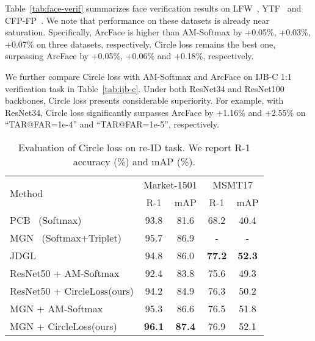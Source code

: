 \documentclass[10pt,twocolumn,letterpaper]{article}
\begin{document}
Table~\ref{tab:face-verif} summarizes face verification results on LFW~\cite{LFWTech}, YTF~\cite{wolf2011face} and CFP-FP~\cite{cfp-paper}.
We note that performance on these datasets is already near saturation. Specifically, ArcFace is higher than AM-Softmax by +0.05\%, +0.03\%, +0.07\% on three datasets, respectively. Circle loss remains the best one, surpassing ArcFace by +0.05\%, +0.06\% and +0.18\%, respectively.

We further compare Circle loss with AM-Softmax and ArcFace on IJB-C 1:1 verification task in Table~\ref{tab:ijb-c}. Under both ResNet34 and ResNet100 backbones, Circle loss presents considerable superiority. For example, with ResNet34, Circle loss significantly surpasses ArcFace by +1.16\% and +2.55\% on ``TAR@FAR=1e-4'' and ``TAR@FAR=1e-5'', respectively.



\begin{table}[t]
    \small
    \centering
    \caption{Evaluation of Circle loss on re-ID task. We report R-1 accuracy (\%) and mAP (\%). }
    \label{tab:person-reid}
    \begin{tabular}{lcccc}
    \toprule
     \multirow{2}{*}{Method} & \multicolumn{2}{c}{Market-1501} & \multicolumn{2}{c}{MSMT17}\\
     \cmidrule{2-5}
     & R-1 & mAP & R-1& mAP \\
\midrule
PCB~\cite{Sun_2018_ECCVPCB} (Softmax)&93.8&81.6&68.2&40.4\\
     MGN~\cite{Wang_2018MGN} (Softmax+Triplet) &95.7&86.9&-&-\\
     JDGL~\cite{Zheng_2019_CVPRJDGL} &94.8&86.0&\textbf{77.2}&\textbf{52.3}\\

    ResNet50 + AM-Softmax &92.4&83.8&75.6&49.3\\
    ResNet50 + CircleLoss(ours) &94.2& 84.9 &76.3&50.2\\
    MGN + AM-Softmax &95.3&86.6&76.5&51.8\\
    MGN + CircleLoss(ours) &\textbf{96.1}&\textbf{87.4}&{76.9}&{52.1}\\
    \bottomrule
    \end{tabular}
\end{table}
\end{document}
